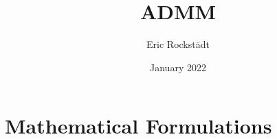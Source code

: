 \documentclass{article}
\title{ADMM}
\author{Eric Rockstädt}
\date{January 2022}
\begin{document}
\maketitle
\newpage

\section{Mathematical Formulations}
\end{document}
